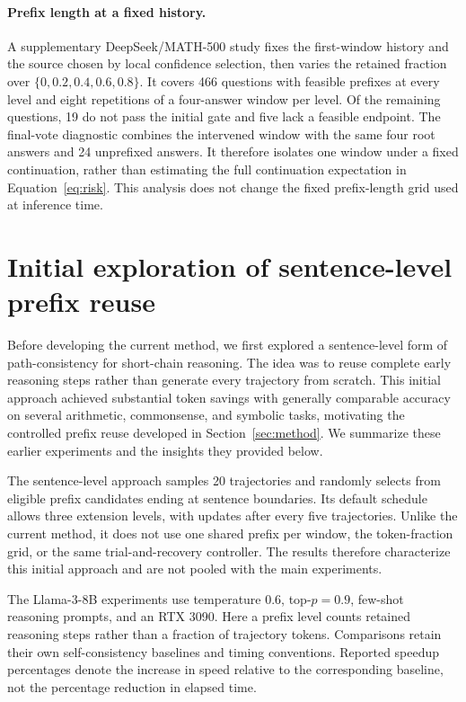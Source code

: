 \paragraph{Prefix length at a fixed history.}
\label{app:length_intervention}
A supplementary DeepSeek/MATH-500 study fixes the first-window history and the source chosen by local confidence selection, then varies the retained fraction over $\{0,0.2,0.4,0.6,0.8\}$. It covers 466 questions with feasible prefixes at every level and eight repetitions of a four-answer window per level. Of the remaining questions, 19 do not pass the initial gate and five lack a feasible endpoint. The final-vote diagnostic combines the intervened window with the same four root answers and 24 unprefixed answers. It therefore isolates one window under a fixed continuation, rather than estimating the full continuation expectation in Equation~\ref{eq:risk}. This analysis does not change the fixed prefix-length grid used at inference time.


\section{Initial exploration of sentence-level prefix reuse}
\label{app:sentence}
Before developing the current method, we first explored a sentence-level form of path-consistency for short-chain reasoning. The idea was to reuse complete early reasoning steps rather than generate every trajectory from scratch. This initial approach achieved substantial token savings with generally comparable accuracy on several arithmetic, commonsense, and symbolic tasks, motivating the controlled prefix reuse developed in Section~\ref{sec:method}. We summarize these earlier experiments and the insights they provided below.

The sentence-level approach samples 20 trajectories and randomly selects from eligible prefix candidates ending at sentence boundaries. Its default schedule allows three extension levels, with updates after every five trajectories. Unlike the current method, it does not use one shared prefix per window, the token-fraction grid, or the same trial-and-recovery controller. The results therefore characterize this initial approach and are not pooled with the main experiments.

The Llama-3-8B experiments use temperature 0.6, top-$p=0.9$, few-shot reasoning prompts, and an RTX 3090. Here a prefix level counts retained reasoning steps rather than a fraction of trajectory tokens. Comparisons retain their own self-consistency baselines and timing conventions. Reported speedup percentages denote the increase in speed relative to the corresponding baseline, not the percentage reduction in elapsed time.

